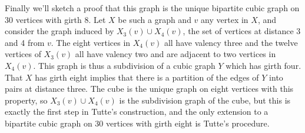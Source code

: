 Finally we'll sketch a proof that this graph is the unique bipartite cubic graph on 30 vertices with girth 8.  Let $X$ be such a graph and $v$ any vertex in $X$, and consider the graph induced by $X_3(v)\cup X_4(v)$, the set of vertices at distance 3 and 4 from $v$.  The eight vertices in $X_4(v)$ all have valency three and the twelve vertices of $X_3(v)$ all have valency two and are adjacent to two vertices in $X_4(v)$.  This graph is thus a subdivision of a cubic graph $Y$ which has girth  four.  That $X$ has girth eight implies that there is a partition of the edges of $Y$ into pairs at distance three.  The cube is the unique graph on eight vertices with this property, so $X_3(v)\cup X_4(v)$ is the subdivision graph of the cube, but this is exactly the first step in Tutte's construction, and the only extension to a bipartite cubic graph on 30 vertices with girth eight is Tutte's procedure.


\ifdraft


\fi